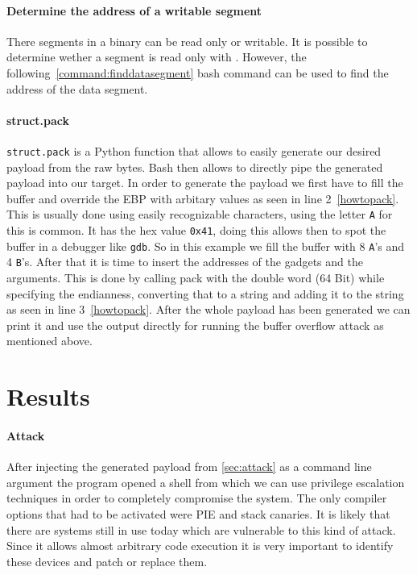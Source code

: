 \documentclass[journal=tosc,submission, notanonymous]{iacrtrans}
\begin{document}
\paragraph{Determine the address of a writable segment}
There segments in a binary can be read only or writable. It is possible to determine wether a segment is read only with . However, the following~\cref{command:finddatasegment} bash command can be used to find the address of the data segment.
\paragraph{struct.pack}
\Verb+struct.pack+ is a Python function that allows to easily generate our desired payload from the raw bytes. Bash then allows to directly pipe the generated payload into our target. In order to generate the payload we first have to fill the buffer and override the EBP with arbitary values as seen in line 2~\cref{howtopack}. This is usually done using easily recognizable characters, using the letter \Verb+A+ for this is common. It has the hex value \Verb+0x41+, doing this allows then to spot the buffer in a debugger like \Verb+gdb+. So in this example we fill the buffer with 8 \Verb+A+'s and 4 \Verb+B+'s. After that it is time to insert the addresses of the gadgets and the arguments. This is done by calling pack with the double word (64 Bit) while specifying the endianness, converting that to a string and adding it to the string as seen in line 3~\cref{howtopack}. After the whole payload has been generated we can print it and use the output directly for running the buffer overflow attack as mentioned above.

\section{Results}
\paragraph{Attack}
After injecting the generated payload from \cref{sec:attack} as a command line argument the program opened a shell from which we can use privilege escalation techniques in order to completely compromise the system. The only compiler options that had to be activated were PIE and stack canaries. It is likely that there are systems still in use today which are vulnerable to this kind of attack. Since it allows almost arbitrary code execution it is very important to identify these devices and patch or replace them.
\end{document}
